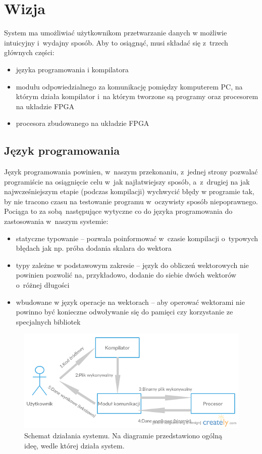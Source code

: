 \section{Wizja}
System ma umożliwiać użytkownikom przetwarzanie danych w możliwie intuicyjny i~wydajny sposób. Aby to osiągnąć, musi składać się z~trzech głównych części:
\begin{itemize}
  \item języka programowania i kompilatora
  \item modułu odpowiedzialnego za komunikację pomiędzy komputerem PC, na którym działa kompilator i~na którym tworzone są programy oraz procesorem na układzie FPGA
  \item procesora zbudowanego na układzie FPGA
\end{itemize}

\subsection{Język programowania}
Język programowania powinien, w~naszym przekonaniu, z~jednej strony pozwalać programiście na osiągnięcie celu w~jak najłatwiejszy sposób, a~z~drugiej na jak najwcześniejszym etapie (podczas kompilacji) wychwycić błędy w programie tak, by nie tracono czasu na testowanie programu w~oczywisty sposób niepoprawnego. Pociąga to za sobą następujące wytyczne co do języka programowania do zastosowania w~naszym systemie:

\begin{itemize}
  \item statyczne typowanie -- pozwala poinformować w~czasie kompilacji o~typowych błędach jak np. próba dodania skalara do wektora
  \item typy zależne w podstawowym zakresie -- język do obliczeń wektorowych nie powinien pozwolić na, przykładowo, dodanie do siebie dwóch wektorów o~różnej długości
  \item wbudowane w język operacje na wektorach -- aby operować wektorami nie powinno być konieczne odwoływanie się do pamięci czy korzystanie ze specjalnych bibliotek
\end{itemize}

\begin{figure}
  \begin{center}
    \includegraphics[scale=0.5]{images/SystemOverview.png}
    \caption{Schemat działania systemu. Na diagramie przedstawiono ogólną ideę, wedle której działa system.}
    \label{fig:SystemOverview}
  \end{center}
\end{figure}


